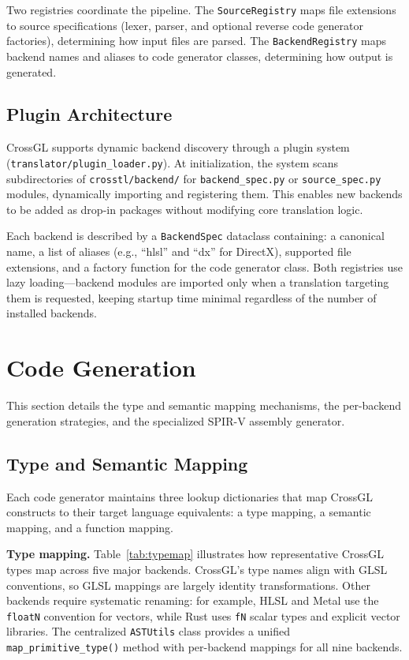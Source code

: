 \documentclass{svproc}
\begin{document}
Two registries coordinate the pipeline. The \texttt{SourceRegistry} maps file extensions to source specifications (lexer, parser, and optional reverse code generator factories), determining how input files are parsed. The \texttt{BackendRegistry} maps backend names and aliases to code generator classes, determining how output is generated.

\subsection{Plugin Architecture}

CrossGL supports dynamic backend discovery through a plugin system (\texttt{translator/plugin\_loader.py}). At initialization, the system scans subdirectories of \texttt{crosstl/backend/} for \texttt{backend\_spec.py} or \texttt{source\_spec.py} modules, dynamically importing and registering them. This enables new backends to be added as drop-in packages without modifying core translation logic.

Each backend is described by a \texttt{BackendSpec} dataclass containing: a canonical name, a list of aliases (e.g., ``hlsl'' and ``dx'' for DirectX), supported file extensions, and a factory function for the code generator class. Both registries use lazy loading---backend modules are imported only when a translation targeting them is requested, keeping startup time minimal regardless of the number of installed backends.
\section{Code Generation}

This section details the type and semantic mapping mechanisms, the per-backend generation strategies, and the specialized SPIR-V assembly generator.

\subsection{Type and Semantic Mapping}

Each code generator maintains three lookup dictionaries that map CrossGL constructs to their target language equivalents: a type mapping, a semantic mapping, and a function mapping.

\textbf{Type mapping.} Table~\ref{tab:typemap} illustrates how representative CrossGL types map across five major backends. CrossGL's type names align with GLSL conventions, so GLSL mappings are largely identity transformations. Other backends require systematic renaming: for example, HLSL and Metal use the \texttt{floatN} convention for vectors, while Rust uses \texttt{fN} scalar types and explicit vector libraries. The centralized \texttt{ASTUtils} class provides a unified \texttt{map\_primitive\_type()} method with per-backend mappings for all nine backends.
\end{document}
